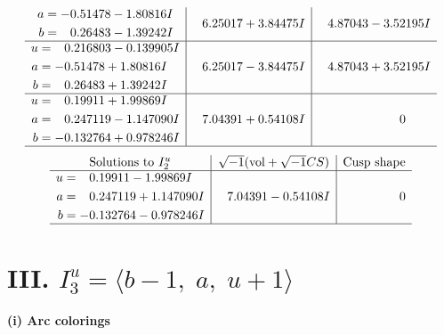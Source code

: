 \documentclass[1p]{elsarticle_modified}
\theoremstyle{definition}
\newcommand{\I}{\sqrt{-1}}
\begin{document}
$$\begin{array}{c|c|c}
\begin{aligned}
a &= -0.51478 - 1.80816 I \\
b &= \phantom{-}0.26483 - 1.39242 I\end{aligned}
 & \phantom{-}6.25017 + 3.84475 I & \phantom{-}4.87043 - 3.52195 I \\ \hline\begin{aligned}
u &= \phantom{-}0.216803 - 0.139905 I \\
a &= -0.51478 + 1.80816 I \\
b &= \phantom{-}0.26483 + 1.39242 I\end{aligned}
 & \phantom{-}6.25017 - 3.84475 I & \phantom{-}4.87043 + 3.52195 I \\ \hline\begin{aligned}
u &= \phantom{-}0.19911 + 1.99869 I \\
a &= \phantom{-}0.247119 - 1.147090 I \\
b &= -0.132764 + 0.978246 I\end{aligned}
 & \phantom{-}7.04391 + 0.54108 I & \phantom{-0.000000 } 0\\
 \hline 
 \end{array}$$\newpage$$\begin{array}{c|c|c}  
\text{Solutions to }I^u_{2}& \I (\text{vol} + \sqrt{-1}CS) & \text{Cusp shape}\\
 \hline 
\begin{aligned}
u &= \phantom{-}0.19911 - 1.99869 I \\
a &= \phantom{-}0.247119 + 1.147090 I \\
b &= -0.132764 - 0.978246 I\end{aligned}
 & \phantom{-}7.04391 - 0.54108 I & \phantom{-0.000000 } 0\\
 \hline 
 \end{array}$$\newpage\newpage\renewcommand{\arraystretch}{1}
\centering \section*{III. $I^u_{3}= \langle b-1,\;a,\;u+1 \rangle$}
\flushleft \textbf{(i) Arc colorings}\\
\end{document}
